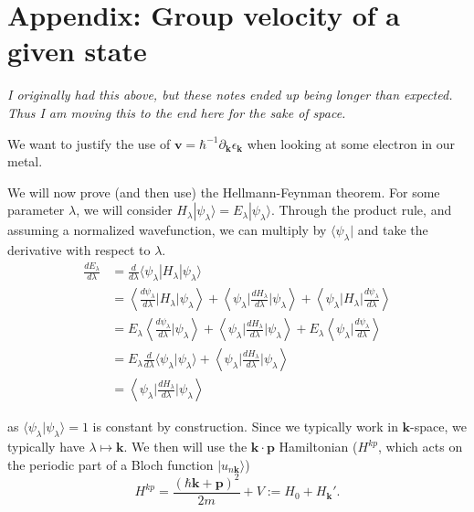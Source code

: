 \documentclass[12pt]{revtex4-2}
\begin{document}
\newpage
\section{Appendix: Group velocity of a given state}

\em I originally had this above, but these notes ended up being longer than expected.  Thus I am moving this to the end here for the sake of space. \em 
\par

We want to justify the use of $\mathbf{v} = \hbar^{-1}\partial_\mathbf{k}\epsilon_\mathbf{k}$ when looking at some electron in our metal.
\par

We will now prove (and then use) the Hellmann-Feynman theorem.  For some parameter $\lambda$, we will consider $H_\lambda |\psi_\lambda\rangle = E_\lambda |\psi_\lambda \rangle$.  Through the product rule, and assuming a normalized wavefunction, we can multiply by $\langle \psi_\lambda|$ and take the derivative with respect to $\lambda$.
\begin{align}
    \frac{dE_\lambda}{d\lambda} &= \frac{d}{d\lambda}\langle \psi_\lambda | H_\lambda | \psi_\lambda\rangle \\
    &= \left\langle \frac{d\psi_\lambda}{d\lambda} \bigg| H_\lambda \bigg| \psi_\lambda \right\rangle + \left\langle \psi_\lambda \bigg| \frac{dH_\lambda}{d\lambda} \bigg| \psi_\lambda \right\rangle + \left\langle \psi_\lambda \bigg| H_\lambda \bigg| \frac{d\psi_\lambda}{d\lambda} \right\rangle \\
    &= E_\lambda \left\langle \frac{d\psi_\lambda}{d\lambda} \bigg| \psi_\lambda \right\rangle + \left\langle \psi_\lambda \bigg| \frac{dH_\lambda}{d\lambda} \bigg| \psi_\lambda \right\rangle + E_\lambda \left\langle \psi_\lambda \bigg| \frac{d\psi_\lambda}{d\lambda} \right\rangle \\
    &= E_\lambda \frac{d}{d\lambda} \langle \psi_\lambda | \psi_\lambda \rangle + \left\langle \psi_\lambda \bigg| \frac{dH_\lambda}{d\lambda} \bigg| \psi_\lambda \right\rangle \\
    &= \left\langle \psi_\lambda \bigg| \frac{dH_\lambda}{d\lambda} \bigg| \psi_\lambda \right\rangle
\end{align}

as $\langle \psi_\lambda | \psi_\lambda \rangle=1$ is constant by construction.  Since we typically work in $\mathbf{k}$-space, we typically have $\lambda \mapsto \mathbf{k}$.  We then will use the $\mathbf{k}\cdot\mathbf{p}$ Hamiltonian ($H^{kp}$, which acts on the periodic part of a Bloch function $|u_{n\mathbf{k}}\rangle$)
\begin{equation}
    H^{kp} = \frac{(\hbar\mathbf{k} + \mathbf{p})^2}{2m} + V := H_0 + H_\mathbf{k}'.
\end{equation}
\end{document}
